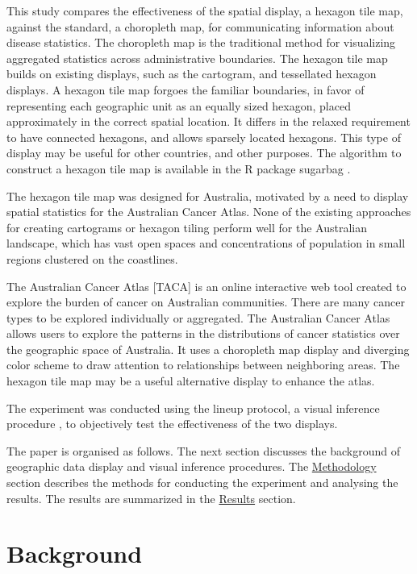 \documentclass{monashthesis}
\begin{document}
This study compares the effectiveness of the spatial display, a hexagon tile map, against the standard, a choropleth map, for communicating information about disease statistics. The choropleth map is the traditional method for visualizing aggregated statistics across administrative boundaries. The hexagon tile map builds on existing displays, such as the cartogram, and tessellated hexagon displays. A hexagon tile map forgoes the familiar boundaries, in favor of representing each geographic unit as an equally sized hexagon, placed approximately in the correct spatial location. It differs in the relaxed requirement to have connected hexagons, and allows sparsely located hexagons. This type of display may be useful for other countries, and other purposes. The algorithm to construct a hexagon tile map is available in the R package sugarbag \autocite{sugarbag}.

The hexagon tile map was designed for Australia, motivated by a need to display spatial statistics for the Australian Cancer Atlas. None of the existing approaches for creating cartograms or hexagon tiling perform well for the Australian landscape, which has vast open spaces and concentrations of population in small regions clustered on the coastlines.

The Australian Cancer Atlas {[}TACA{]} is an online interactive web tool created to explore the burden of cancer on Australian communities. There are many cancer types to be explored individually or aggregated. The Australian Cancer Atlas allows users to explore the patterns in the distributions of cancer statistics over the geographic space of Australia. It uses a choropleth map display and diverging color scheme to draw attention to relationships between neighboring areas. The hexagon tile map may be a useful alternative display to enhance the atlas.

The experiment was conducted using the lineup protocol, a visual inference procedure \autocite{GIIV}, to objectively test the effectiveness of the two displays.

The paper is organised as follows. The next section discusses the background of geographic data display and visual inference procedures. The \protect\hyperlink{methodology}{Methodology} section describes the methods for conducting the experiment and analysing the results. The results are summarized in the \protect\hyperlink{results}{Results} section.

\hypertarget{background}{%
\section{Background}\label{background}}
\end{document}
